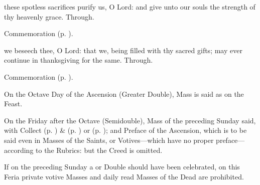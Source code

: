 \secret
{} these spotless sacrifices purify us, O Lord: and give unto our souls the strength of thy heavenly grace. Through.


\begin{rubric}
    Commemoration  (p. \pageref{AscensionSecret}).
\end{rubric}


\postcommunion
{} we beseech thee, O Lord: that we, being filled with thy sacred gifts; may ever continue in thanksgiving for the same. Through.


\begin{rubric}
    Commemoration  (p. \pageref{AscensionPostcommunion}).
\end{rubric}

\begin{rubric}
    On the Octave Day of the Ascension (Greater Double), Mass is said as on the Feast.
\end{rubric}

\begin{rubric}
    On the Friday after the Octave (Semidouble), Mass of the preceding Sunday said, with   Collect  (p. \pageref{SPMaryInEaster}) \&   (p. \pageref{SPAgainst}) or  (p. \pageref{SPChiefBishop});  and Preface of the Ascension, which is to be said even in Masses of the Saints, or Votives---which have no proper preface---according to the Rubrics: but the Creed is omitted.
\end{rubric}
\begin{rubric}
    If on the preceding Sunday a  or  Double should have been celebrated, on this Feria private votive Masses and daily read Masses of the Dead are prohibited.
\end{rubric}



